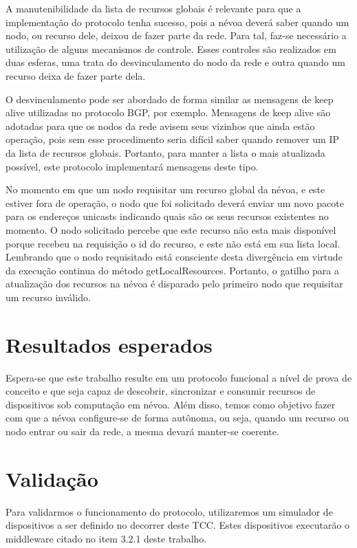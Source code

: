 A manutenibilidade da lista de recursos globais é relevante para que a implementação do protocolo tenha sucesso, pois a névoa deverá saber quando um nodo, ou recurso dele, deixou de fazer parte da rede.
Para tal, faz-se necessário a utilização de alguns mecanismos de controle.
Esses controles são realizados em duas esferas, uma trata do desvinculamento do nodo da rede e outra quando um recurso deixa de fazer parte dela.

O desvinculamento pode ser abordado de forma similar as mensagens de keep alive utilizadas no protocolo BGP, por exemplo.
Mensagens de keep alive são adotadas para que os nodos da rede avisem seus vizinhos que ainda estão operação, pois sem esse procedimento seria difícil
saber quando remover um IP da lista de recursos globais. Portanto, para manter a lista o mais atualizada possível, este protocolo implementará mensagens deste tipo.

No momento em que um nodo requisitar um recurso global da névoa, e este estiver fora de operação, o nodo que foi solicitado deverá enviar um novo pacote para os endereços unicasts indicando quais são os seus recursos existentes no momento.
O nodo solicitado percebe que este recurso não esta mais disponível porque recebeu na requisição o id do recurso, e este não está em sua lista local.
Lembrando que o nodo requisitado está consciente desta divergência em virtude da execução continua do método getLocalResources. Portanto, o gatilho para a atualização dos recursos na névoa
é disparado pelo primeiro nodo que requisitar um recurso inválido.


\section{Resultados esperados}

Espera-se que este trabalho resulte em um protocolo funcional a nível de prova de conceito e que seja capaz de descobrir, sincronizar e consumir recursos de dispositivos sob computação em névoa.
Além disso, temos como objetivo fazer com que a névoa configure-se de forma autônoma, ou seja, quando um recurso ou nodo entrar ou sair da rede, a mesma devará manter-se coerente.

\section{Validação}

Para validarmos o funcionamento do protocolo, utilizaremos um simulador de dispositivos a ser definido no decorrer deste TCC.
Estes dispositivos executarão o middleware citado no item 3.2.1 deste trabalho.

